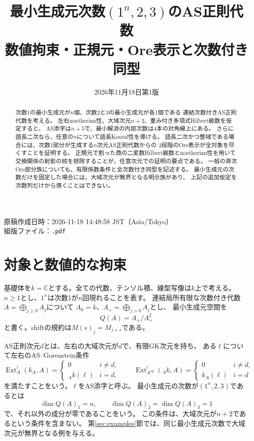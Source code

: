 \documentclass[11pt,a4paper]{ltjsarticle}
\title{最小生成元次数$(1^n,2,3)$のAS正則代数\\
\large 数値拘束・正規元・Ore表示と次数付き同型}
\author{}
\date{2026年11月18日\quad 第1版}
\theoremstyle{definition}
\newcommand{\Ext}{\operatorname{Ext}}
\begin{document}
\hypersetup{pageanchor=false}
\begin{titlepage}
\maketitle
\thispagestyle{empty}
\begin{abstract}
次数1の最小生成元が$n$個、次数2と3の最小生成元が各1個である
連結次数付きAS正則代数を考える。
左右noetherian性、大域次元$n+2$、重み付き多項式Hilbert級数を仮定すると、
AS添字は$n+5$で、最小解消の内部次数は4本の対角線上にある。
さらに語長二次なら、任意の$n$について語長Koszul性を導ける。
語長二次かつ整域である場合には、次数1部分が生成する$n$次元AS正則代数からの
2段階のOre表示が全対象を尽くすことを証明する。
正規元で割った商の二変数Hilbert級数とnoetherian性を用いて
交換関係の射影の核を排除することが、任意次元での証明の要点である。
一般の斉次Ore部分族についても、有限係数条件と全次数付き同型を記述する。
最小生成元の次数だけを固定した場合には、大域次元が無界となる明示族があり、
上記の追加仮定を次数列だけから導くことはできない。
\end{abstract}
\vfill
\begin{center}
原稿作成日時：2026-11-18 14:48:58 JST（Asia/Tokyo）\\
組版ファイル：\texttt{\jobname.pdf}
\end{center}
\end{titlepage}
\hypersetup{pageanchor=true}
\tableofcontents
\clearpage
{}

\section{対象と数値的な拘束}\label{sec:scope-numerical}
基礎体を$k=\mathbb C$とする。全ての代数、テンソル積、線型写像は$k$上で考える。
$n\geq1$とし、$1^n$は次数1が$n$回現れることを表す。
連結局所有限な次数付き代数$A=\bigoplus_{j\geq0}A_j$について
$A_0=k$、$A_+=\bigoplus_{j>0}A_j$とし、
最小生成元空間を
\[
Q(A)=A_+/A_+^2
\]
と書く。shiftの規約は$M(s)_j=M_{j+s}$である。

AS正則次元$d$とは、左右の大域次元が$d$で、有限GK次元を持ち、
ある$\ell$について左右のAS--Gorenstein条件
\[
\Ext_A^i(k_A,A)=
\begin{cases}0&i\ne d,\\ {}_Ak(\ell)&i=d,\end{cases}
\qquad
\Ext_{A^{\mathrm{op}}}^i({}_Ak,A)=
\begin{cases}0&i\ne d,\\ k_A(\ell)&i=d\end{cases}
\]
を満たすことをいう。$\ell$をAS添字と呼ぶ。
最小生成元の次数が$(1^n,2,3)$であるとは
\[
\dim Q(A)_1=n,\qquad \dim Q(A)_2=\dim Q(A)_3=1
\]
で、それ以外の成分が零であることをいう。
この条件は、大域次元が$n+2$であるという条件を含まない。
第\ref{sec:examples}節では、同じ最小生成元次数で大域次元が無界となる例を与える。
\end{document}
